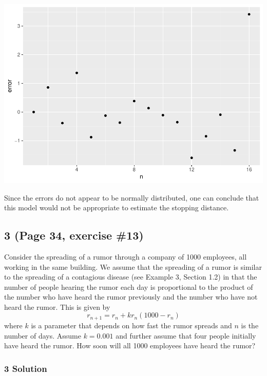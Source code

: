 \documentclass[]{article}
\begin{document}
\includegraphics{DATA_609_Homework_1_files/figure-latex/unnamed-chunk-3-1.pdf}

Since the errors do not appear to be normally distributed, one can
conclude that this model would not be appropriate to estimate the
stopping distance.

\hypertarget{page-34-exercise-13}{%
\subsection{3 (Page 34, exercise \#13)}\label{page-34-exercise-13}}

Consider the spreading of a rumor through a company of 1000 employees,
all working in the same building. We assume that the spreading of a
rumor is similar to the spreading of a contagious disease (see Example
3, Section 1.2) in that the number of people hearing the rumor each day
is proportional to the product of the number who have heard the rumor
previously and the number who have not heard the rumor. This is given by
\begin{equation*}
r_{n + 1} = r_n + kr_n(1000 - r_n)
\end{equation*} where \(k\) is a parameter that depends on how fast the
rumor spreads and \(n\) is the number of days. Assume \(k = 0.001\) and
further assume that four people initially have heard the rumor. How soon
will all 1000 employees have heard the rumor?

\hypertarget{solution-2}{%
\subsubsection{3 Solution}\label{solution-2}}
\end{document}
